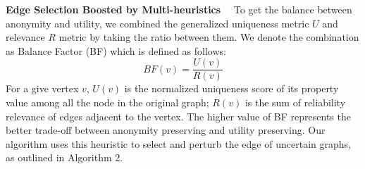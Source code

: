 \textbf{Edge Selection Boosted by Multi-heuristics}~~
To get the balance between anonymity and utility, we combined the generalized uniqueness metric $U$ and relevance $R$ metric by taking the ratio between them. 
We denote the combination as Balance Factor (BF) which is defined as follows:
\begin{equation*}
    BF(v)=\frac{U(v)}{R(v)}
\end{equation*}
For a give vertex $v$, $U(v)$ is the normalized uniqueness score of its property value among all the node in the original graph; $R(v)$ is the sum of reliability relevance of edges adjacent to the vertex. 
The higher value of BF represents the better trade-off between anonymity preserving and utility preserving. 
Our algorithm uses this heuristic to select and perturb the edge of uncertain graphs, as outlined in Algorithm 2. 




